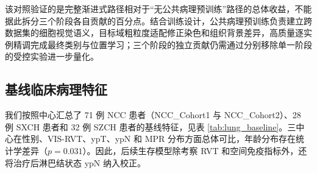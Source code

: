 该对照验证的是完整渐进式路径相对于“无公共病理预训练”路径的总体收益，不能据此拆分三个阶段各自贡献的百分点。结合训练设计，公共病理预训练负责建立跨数据集的细胞视觉语义，目标域粗粒度适配修正染色和组织背景差异，高质量逐实例精调完成最终类别与位置学习；三个阶段的独立贡献仍需通过分别移除单一阶段的受控实验进一步量化。

\subsection{基线临床病理特征}
我们按照中心汇总了 71 例 NCC 患者（NCC\_Cohort1 与 NCC\_Cohort2）、28 例 SXCH 患者和 32 例 SZCH 患者的基线特征，见表 \ref{tab:lung_baseline}。三中心在性别、VIS-RVT、ypT、ypN 和 MPR 分布方面总体可比，年龄分布存在统计学差异（$p=0.031$）。因此，后续生存模型除考察 RVT 和空间免疫指标外，还将治疗后淋巴结状态 ypN 纳入校正。

